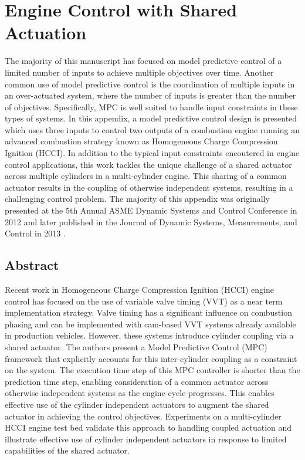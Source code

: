 \chapter{Engine Control with Shared Actuation}

The majority of this manuscript has focused on model predictive control of a limited number of inputs to achieve multiple objectives over time. Another common use of model predictive control is the coordination of multiple inputs in an over-actuated system, where the number of inputs is greater than the number of objectives. Specifically, MPC is well suited to handle input constraints in these types of systems. In this appendix, a model predictive control design is presented which uses three inputs to control two outputs of a combustion engine running an advanced combustion strategy known as Homogeneous Charge Compression Ignition (HCCI). In addition to the typical input constraints encoutered in engine control applications, this work tackles the unique challenge of a shared actuator across multiple cylinders in a multi-cylinder engine. This sharing of a common actuator results in the coupling of otherwise independent systems, resulting in a challenging control problem. The majority of this appendix was originally presented at the 5th Annual ASME Dynamic Systems and Control Conference in 2012 \cite{Erlien2012} and later published in the Journal of Dynamic Systems, Measurements, and Control in 2013 \cite{ErlienJDSMC_2013}.

\section{Abstract} %
Recent work in Homogeneous Charge Compression Ignition (HCCI) engine control has focused on the use of variable valve timing (VVT) as a near term implementation strategy. Valve timing has a significant influence on combustion phasing and can be implemented with cam-based VVT systems already available in production vehicles. However, these systems introduce cylinder coupling via a shared actuator. The authors present a Model Predictive Control (MPC) framework that explicitly accounts for this inter-cylinder coupling as a constraint on the system. The execution time step of this MPC controller is shorter than the prediction time step, enabling consideration of a common  actuator across otherwise independent systems as the engine cycle progresses. This enables effective use of the cylinder independent actuators to augment the shared actuator in achieving the control objectives. Experiments on a multi-cylinder HCCI engine test bed validate this approach to handling coupled actuation and illustrate effective use of cylinder independent actuators in response to limited capabilities of the shared actuator.

